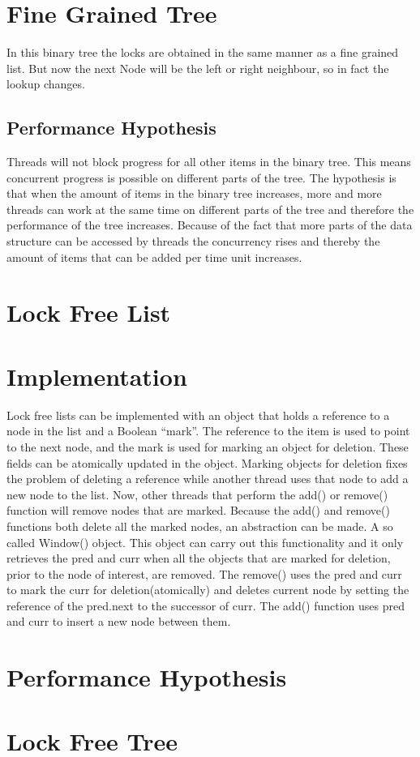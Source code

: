 \documentclass[10pt,a4paper]{article}
\begin{document}
\section{Fine Grained Tree} In this binary tree the locks are obtained in the
same manner as a fine grained list. But now the next Node will be the left or
right neighbour, so in fact the lookup changes. 

\subsection{Performance Hypothesis} Threads will not block progress for all
other items in the binary tree. This means concurrent progress is possible on
different parts of the tree.  The hypothesis is that when the amount of items
in the binary tree increases, more and more threads can work at the same time
on different parts of the tree and therefore the performance of the tree
increases.  Because of the fact that more parts of the data structure can be
accessed by threads the concurrency rises and thereby the amount of items that
can be added per time unit increases.


\section{Lock Free List} \section{Implementation} Lock free lists can be
implemented with an object that holds a reference to a node in the list and a
Boolean ``mark''. The reference to the item is used to point to the next node,
and the mark is used for marking an object for deletion. These fields can be
atomically updated in the object. Marking objects for deletion fixes the
problem of deleting a reference while another thread uses that node to add a
new node to the list. Now, other threads that perform the add() or remove()
function will remove nodes that are marked. Because the add() and remove()
functions both delete all the marked nodes, an abstraction can be made. A so
called Window() object. This object can carry out this functionality and it
only retrieves the pred and curr when all the objects that are marked for
deletion, prior to the node of interest, are removed. The remove() uses the
pred and curr to mark the curr for deletion(atomically) and deletes current
node by setting the reference of the pred.next to the successor of curr. The
add() function uses pred and curr to insert a new node between them.

\section{Performance Hypothesis}

\section{Lock Free Tree}
\end{document}
